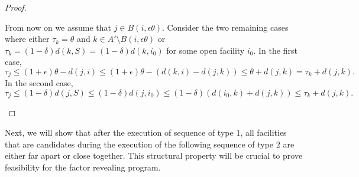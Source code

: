 \begin{proof}
\begin{enumerate}
\[            \]
            From now on we assume that $j \in B(i,\epsilon \theta)$. 
            Consider the two remaining cases where either $\tau_k =\theta$ and $k \in A' \setminus B(i,\epsilon \theta)$ or $\tau_k = (1-\delta)d(k,S) = (1-\delta)d(k,i_0)$ for some open facility $i_0$. In the first case,
              \[
                \tau_j \le (1+\epsilon) \theta - d(j,i) \le (1+\epsilon) \theta - (d(k,i) - d(j,k)) \le \theta + d(j,k) = \tau_k + d(j,k).
              \]
              In the second case, 
              \[
                \tau_j \le (1-\delta)d(j,S) \le (1-\delta)d(j,i_0) \le (1-\delta) (d(i_0,k) + d(j,k)) \le \tau_k + d(j,k).
              \]
    \end{enumerate}
\end{proof}

Next, we will show that after the execution of sequence of type $1$, all facilities that are candidates during the execution of the following sequence of type $2$ are either far apart or close together. This structural property will be crucial to prove feasibility for the factor revealing program.

